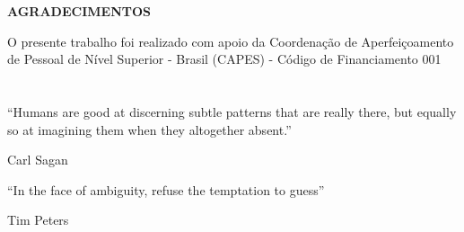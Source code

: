 

\newpage
\begin{center}
\textbf{AGRADECIMENTOS}
\end{center}
\vspace{0.5cm}



O presente trabalho foi realizado com apoio da
Coordenação de Aperfeiçoamento de Pessoal de Nível Superior - Brasil (CAPES) - Código
de Financiamento 001


\newpage
\section*{}
\vspace{16cm}


 
\setlength{\epigraphrule}{0pt}
\epigraph{
``Humans are good at discerning subtle patterns that are really there, but equally so at imagining them when they altogether absent.''}{Carl Sagan}

\setlength{\epigraphrule}{0pt}
\epigraph{
``In the face of ambiguity, refuse the temptation to guess''}{Tim Peters}



